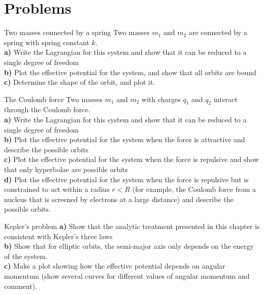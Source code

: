 %
\section{Problems}
\begin{problem}{Two masses connected by a spring}
Two masses $m_1$ and $m_2$ are connected by a spring with spring constant $k$.\\
\textbf{a)} Write the Lagrangian for this system and show that it can be reduced to a single degree of freedom\\
\textbf{b)} Plot the effective potential for the system, and show that all orbits are bound\\
\textbf{c)} Determine the shape of the orbit, and plot it.
\end{problem}

\begin{problem}{The Coulomb force}
Two masses $m_1$ and $m_2$ with charges $q_1$ and $q_2$ interact through the Coulomb force.\\
\textbf{a)} Write the Lagrangian for this system and show that it can be reduced to a single degree of freedom\\
\textbf{b)} Plot the effective potential for the system when the force is attractive and describe the possible orbits\\
\textbf{c)} Plot the effective potential for the system when the force is repulsive and show that only hyperbolae are possible orbits\\
\textbf{d)} Plot the effective potential for the system when the force is repulsive but is constrained to act within a radius $r<R$ (for example, the Coulomb force from a nucleus that is screened by electrons at a large distance) and describe the possible orbits. 
\end{problem}

\begin{problem}{Kepler's problem}
\textbf{a)} Show that the analytic treatment presented in this chapter is consistent with Kepler's three laws\\
\textbf{b)} Show that for elliptic orbits, the semi-major axis only depends on the energy of the system.\\
\textbf{c)} Make a plot showing how the effective potential depends on angular momentum (show several curves for different values of angular momentum and comment).
\end{problem}

